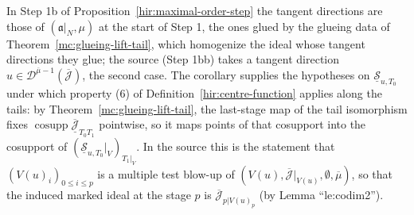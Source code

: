 In Step 1b of Proposition~\ref{hir:maximal-order-step} the tangent directions are those of \((\mathfrak a|_N,\mu)\) at the start of Step 1, the ones glued by the glueing
data of Theorem~\ref{mc:glueing-lift-tail}, which homogenize the ideal whose tangent directions they glue; the source (Step 1bb) takes a tangent direction
\(u\in\mathcal D^{\overline\mu-1}(\overline{\mathcal J})\), the second case. The corollary supplies the hypotheses on \(\underline{\mathcal S}_{u,T_0}\) under which property (6) of
Definition~\ref{hir:centre-function} applies along the tails: by Theorem~\ref{mc:glueing-lift-tail}, the last-stage map of the tail isomorphism fixes
\(\operatorname{cosupp}\overline{\underline{\mathcal J}}_{T_0T_1}\) pointwise, so it maps points of that cosupport into the cosupport of \((\underline{\mathcal S}_{u,T_0}|_V)_{T_1|_V}\). In the
source this is the statement that \((V(u)_i)_{0\le i\le p}\) is a multiple test blow-up of \((V(u),\overline{\mathcal J}|_{V(u)},\emptyset,\overline\mu)\), so that the induced marked
ideal at the stage \(p\) is \(\overline{\mathcal J}_{p|V(u)_p}\) (by Lemma ``le:codim2'').

